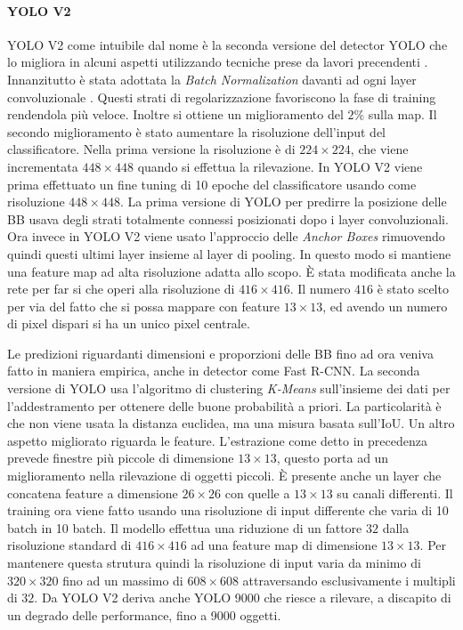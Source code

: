 \paragraph{YOLO V2}
\ac{YOLO} V2 come intuibile dal nome è la seconda versione del detector \ac{YOLO} che lo migliora in alcuni aspetti utilizzando tecniche prese da lavori precendenti \cite{redmon2017yolo9000}.
Innanzitutto è stata adottata la \textit{Batch Normalization} davanti ad ogni layer convoluzionale \cite{ioffe2015batch}. Questi strati di regolarizzazione favoriscono la fase 
di training rendendola più veloce. Inoltre si ottiene un miglioramento del $2\%$ sulla \ac{map}.
Il secondo miglioramento è stato aumentare la risoluzione dell'input del classificatore. Nella prima versione la risoluzione è di $224 \times 224$, che viene incrementata $448 \times 448$ quando si effettua la rilevazione.
In \ac{YOLO} V2 viene prima effettuato un fine tuning di 10 epoche del classificatore usando come risoluzione $448 \times 448$.
La prima versione di \ac{YOLO} per predirre la posizione delle \ac{BB} usava degli strati totalmente connessi posizionati dopo i layer convoluzionali. Ora invece in \ac{YOLO} V2 viene usato l'approccio delle \textit{Anchor Boxes} rimuovendo quindi questi ultimi layer insieme al layer di pooling. 
In questo modo si mantiene una feature map ad alta risoluzione adatta allo scopo. È stata modificata anche la rete per far si che operi alla risoluzione di $416 \times 416$. Il numero $416$ è stato scelto per via del fatto che si possa mappare con feature $13 \times 13$, ed avendo un numero di pixel dispari si ha un unico pixel centrale. 

Le predizioni riguardanti dimensioni e proporzioni delle \ac{BB} fino ad ora veniva fatto in maniera empirica, anche in detector come Fast R-CNN. La seconda versione di \ac{YOLO} usa l'algoritmo di clustering \textit{K-Means} sull'insieme dei dati per l'addestramento per ottenere delle buone probabilità a priori.  La particolarità è che non viene usata la distanza euclidea, ma una misura basata sull'\ac{IoU}. 
Un altro aspetto migliorato riguarda le feature. L'estrazione come detto in precedenza prevede finestre più piccole di dimensione $13 \times 13$, questo porta ad un miglioramento nella rilevazione di oggetti piccoli. È presente anche un layer che concatena feature a dimensione $26 \times 26$ con quelle a $13 \times 13$ su canali differenti. 
Il training ora viene fatto usando una risoluzione di input differente che varia di 10 batch in 10 batch. Il modello effettua una riduzione di un fattore $32$ dalla risoluzione standard di $416 \times 416$ ad una feature map di dimensione $13 \times 13$. Per mantenere questa strutura quindi la risoluzione di input varia da minimo di $320 \times 320$ fino ad un massimo di $608 \times 608$ attraversando esclusivamente i multipli di $32$. Da \ac{YOLO} V2 deriva anche \ac{YOLO} 9000 che riesce a rilevare, a discapito di un degrado delle performance, fino a 9000 oggetti.
